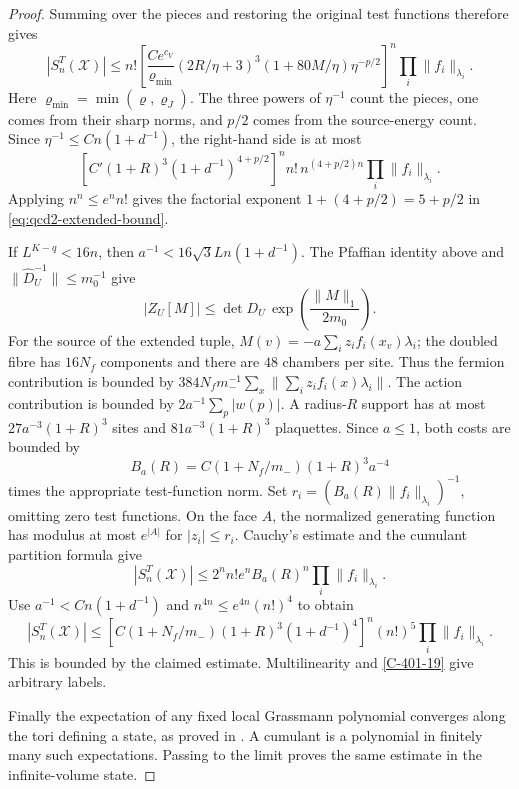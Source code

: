 \documentclass[11pt,letterpaper,reqno]{amsart}
\theoremstyle{definition}
\theoremstyle{remark}
\begin{document}
\begin{proof}
Summing over the pieces and restoring the original test
functions therefore gives
\[
 |S_n^T(\mathcal X)|\le n!
 \left[\frac{Ce^{c_V}}{\varrho_{\min}}
       (2R/\eta+3)^3(1+80M/\eta)\eta^{-p/2}\right]^n
       \prod_i\|f_i\|_{\lambda_i}.
\]
Here $\varrho_{\min}=\min(\varrho,\varrho_J)$.
The three powers of $\eta^{-1}$ count the pieces, one
comes from their sharp norms, and $p/2$ comes from the
source-energy count. Since $\eta^{-1}\le Cn(1+d^{-1})$,
the right-hand side is at most
\[
 \left[C'(1+R)^3(1+d^{-1})^{4+p/2}\right]^n
       n!\,n^{(4+p/2)n}\prod_i\|f_i\|_{\lambda_i}.
\]
Applying $n^n\le e^nn!$ gives the factorial exponent
$1+(4+p/2)=5+p/2$ in \eqref{eq:qcd2-extended-bound}.

If $L^{K-q}<16n$, then
$a^{-1}<16\sqrt3Ln(1+d^{-1})$. The Pfaffian identity
above and $\|\widehat D_U^{-1}\|\le m_0^{-1}$ give
\[
 |Z_U[M]|\le\det D_U\,
                \exp\left(\frac{\|M\|_1}{2m_0}\right).
\]
For the source of the extended tuple,
$M(v)=-a\sum_i z_if_i(x_v)\lambda_i$; the doubled fibre
has $16N_f$ components and there are $48$ chambers per
site. Thus the fermion contribution is bounded by
$384N_fm_-^{-1}\sum_x\|\sum_i z_if_i(x)\lambda_i\|$.
The action contribution is bounded by
$2a^{-1}\sum_p|w(p)|$.
A radius-$R$ support has at most $27a^{-3}(1+R)^3$ sites
and $81a^{-3}(1+R)^3$ plaquettes. Since $a\le1$,
both costs are bounded by
\[
 B_a(R)=C(1+N_f/m_-)(1+R)^3a^{-4}
\]
times the appropriate test-function norm. Set
$r_i=(B_a(R)\|f_i\|_{\lambda_i})^{-1}$, omitting zero
test functions. On the face $A$, the normalized generating
function has modulus at most $e^{|A|}$ for $|z_i|\le r_i$.
Cauchy's estimate and the cumulant partition formula give
\[
 |S_n^T(\mathcal X)|\le
          2^nn!e^nB_a(R)^n\prod_i\|f_i\|_{\lambda_i}.
\]
Use $a^{-1}<Cn(1+d^{-1})$ and $n^{4n}\le e^{4n}(n!)^4$
to obtain
\[
 |S_n^T(\mathcal X)|
 \le[C(1+N_f/m_-)(1+R)^3(1+d^{-1})^4]^n
                         (n!)^5\prod_i\|f_i\|_{\lambda_i}.
\]
This is bounded by the claimed estimate. Multilinearity
and \cref{C-401-19} give arbitrary labels.

Finally the expectation of any fixed local Grassmann
polynomial converges along the tori defining a state,
as proved in \cite[Prop. 2.5]{QCDM1}. A cumulant is a polynomial in finitely
many such expectations. Passing to the limit proves the
same estimate in the infinite-volume state.
\end{proof}
\end{document}

